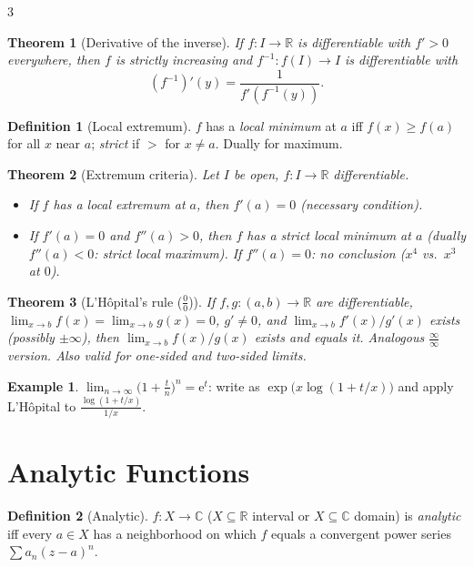 \documentclass[10pt,a4paper,landscape]{article}
\theoremstyle{definition}
\newtheorem{defn}{Definition}[section]
\newtheorem{exm}{Example}[section]
\theoremstyle{plain}
\newtheorem{thm}{Theorem}[section]
\theoremstyle{remark}
\newcommand{\R}{\mathbb{R}}
\newcommand{\C}{\mathbb{C}}
\newcommand{\e}{\mathrm{e}}
\newcommand{\oo}{\infty}
\begin{document}
\begin{multicols*}{3}
\begin{thm}[Derivative of the inverse]
If $f: I \to \R$ is differentiable with $f' > 0$ everywhere, then $f$ is strictly increasing and $f^{-1}: f(I) \to I$ is differentiable with
\[
(f^{-1})'(y) = \frac{1}{f'(f^{-1}(y))}.
\]
\end{thm}

\begin{defn}[Local extremum]
$f$ has a \emph{local minimum} at $a$ iff $f(x) \ge f(a)$ for all $x$ near $a$; \emph{strict} if $>$ for $x \neq a$. Dually for maximum.
\end{defn}

\begin{thm}[Extremum criteria]
Let $I$ be open, $f: I \to \R$ differentiable.
\begin{itemize}
\item If $f$ has a local extremum at $a$, then $f'(a) = 0$ (necessary condition).
\item If $f'(a) = 0$ and $f''(a) > 0$, then $f$ has a strict local minimum at $a$ (dually $f''(a) < 0$: strict local maximum). If $f''(a) = 0$: no conclusion ($x^4$ vs.\ $x^3$ at $0$).
\end{itemize}
\end{thm}

\begin{thm}[L'H\^opital's rule ($\frac{0}{0}$)]
If $f, g: (a,b) \to \R$ are differentiable, $\lim_{x \to b} f(x) = \lim_{x \to b} g(x) = 0$, $g' \neq 0$, and $\lim_{x \to b} f'(x)/g'(x)$ exists (possibly $\pm\oo$), then $\lim_{x \to b} f(x)/g(x)$ exists and equals it. Analogous $\frac{\oo}{\oo}$ version. Also valid for one-sided and two-sided limits.
\end{thm}

\begin{exm}
$\lim_{n \to \oo} \bigl(1 + \frac{t}{n}\bigr)^n = \e^t$: write as $\exp\bigl(x \log(1 + t/x)\bigr)$ and apply L'H\^opital to $\frac{\log(1+t/x)}{1/x}$.
\end{exm}

\section{Analytic Functions}

\begin{defn}[Analytic]
$f: X \to \C$ ($X \subseteq \R$ interval or $X \subseteq \C$ domain) is \emph{analytic} iff every $a \in X$ has a neighborhood on which $f$ equals a convergent power series $\sum a_n (z-a)^n$.
\end{defn}


\end{multicols*}
\end{document}

